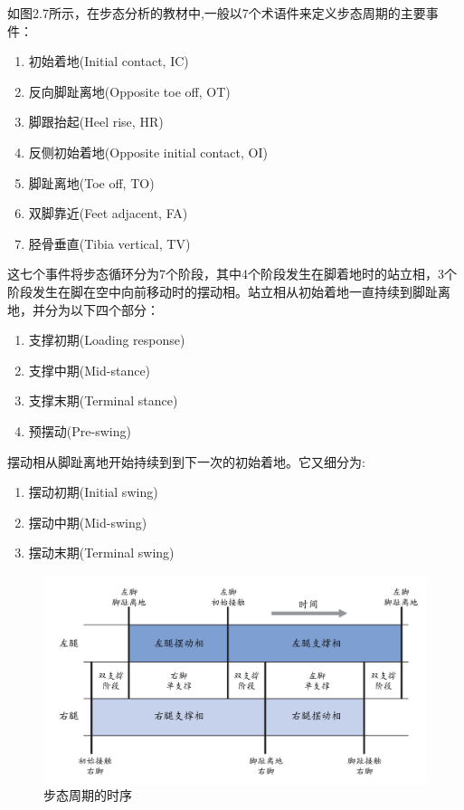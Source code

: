 如图2.7所示，在步态分析的教材\cite{p44}中,一般以7个术语件来定义步态周期的主要事件：
\begin{enumerate}
    \item 初始着地(Initial contact, IC)
    \item 反向脚趾离地(Opposite toe off, OT)
    \item 脚跟抬起(Heel rise, HR)
    \item 反侧初始着地(Opposite initial contact, OI)
    \item 脚趾离地(Toe off, TO)
    \item 双脚靠近(Feet adjacent, FA)
    \item 胫骨垂直(Tibia vertical, TV)
\end{enumerate}

这七个事件将步态循环分为7个阶段，其中4个阶段发生在脚着地时的站立相，3个阶段发生在脚在空中向前移动时的摆动相。站立相从初始着地一直持续到脚趾离地，并分为以下四个部分：
\begin{enumerate}
    \item 支撑初期(Loading response)
    \item 支撑中期(Mid-stance)
    \item 支撑末期(Terminal stance)
    \item 预摆动(Pre-swing)
\end{enumerate}

摆动相从脚趾离地开始持续到到下一次的初始着地。它又细分为:
\begin{enumerate}
    \item 摆动初期(Initial swing)
    \item 摆动中期(Mid-swing)
    \item 摆动末期(Terminal swing)
\end{enumerate}

\begin{figure}[htb]
    \includegraphics[width=15cm]{fig/f30.jpg}
    \caption{步态周期的时序}
    \label{fig:mark}
\end{figure}

